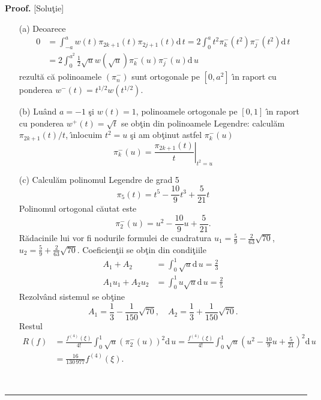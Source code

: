 \documentclass[a4paper]{article}%
\newenvironment{proof}[1][Proof]{\noindent\textbf{#1.} }{\ \rule{0.5em}{0.5em}}
\begin{document}
\begin{proof}
[Solu\c{t}ie]

\begin{enumerate}
\item[(a)] Deoarece%
\begin{align*}
0  & =\int_{-a}^{a}w(t)\pi_{2k+1}(t)\pi_{2j+1}(t)\mathrm{d}\,t=2\int_{0}%
^{a}t^{2}\pi_{k}^{-}(t^{2})\pi_{j}^{-}\left(  t^{2}\right)  \mathrm{d}\,t\\
& =2\int_{0}^{a^{2}}\frac{1}{2}\sqrt{u}w\left(  \sqrt{u}\right)  \pi_{k}%
^{-}(u)\pi_{j}^{-}\left(  u\right)  \mathrm{d}\,u
\end{align*}
rezult\u{a} c\u{a} polinoamele $\left(  \pi_{n}^{-}\right)  $ sunt ortogonale
pe $[0,a^{2}]$ \^{\i}n raport cu ponderea $w^{-}(t)=t^{1/2}w(t^{1/2})$.

\item[(b)] Lu\^{a}nd $a=-1$ \c{s}i $w(t)=1$, polinoamele ortogonale pe $[0,1]$
\^{\i}n raport cu ponderea $w^{+}(t)=\sqrt{t}$ se ob\c{t}in din polinoamele
Legendre: calcul\u{a}m $\pi_{2k+1}(t)/t$, \^{\i}nlocuim $t^{2}=u$ \c{s}i am
ob\c{t}inut astfel $\pi_{k}^{-}(u)$%
\[
\pi_{k}^{-}(u)=\left.  \frac{\pi_{2k+1}(t)}{t}\right\vert _{t^{2}=u}%
\]


\item[(c)] Calcul\u{a}m polinomul Legendre de grad 5
\[
\pi_{5}(t)=t^{5}-\frac{10}{9}t^{3}+\frac{5}{21}t
\]
Polinomul ortogonal c\u{a}utat este%
\[
\pi_{2}^{-}(u)=u^{2}-\frac{10}{9}u+\frac{5}{21}.
\]
R\u{a}dacinile lui vor fi nodurile formulei de cuadratura $u_{1}=\frac{5}%
{9}-\frac{2}{63}\sqrt{70}$, $u_{2}=\frac{5}{9}+\frac{2}{63}\sqrt{70}$.
Coeficien\c{t}ii se ob\c{t}in din condi\c{t}iile%
\begin{align*}
A_{1}+A_{2}  & =\int_{0}^{1}\sqrt{u}\mathrm{d}\,u=\frac{2}{3}\\
A_{1}u_{1}+A_{2}u_{2}  & =\int_{0}^{1}u\sqrt{u}\mathrm{d}\,u=\frac{2}{5}%
\end{align*}
Rezolv\^{a}nd sistemul se ob\c{t}ine%
\[
A_{1}=\frac{1}{3}-\frac{1}{150}\sqrt{70},\quad A_{2}=\frac{1}{3}+\frac{1}%
{150}\sqrt{70}.
\]
Restul%
\begin{align*}
R(f)  & =\frac{f^{(4)}(\xi)}{4!}\int_{0}^{1}\sqrt{u}\left(  \pi_{2}%
^{-}(u)\right)  ^{2}\mathrm{d}\,u=\frac{f^{(4)}(\xi)}{4!}\int_{0}^{1}\sqrt
{u}\left(  u^{2}-\frac{10}{9}u+\frac{5}{21}\right)  ^{2}\mathrm{d}\,u\\
& =\frac{16}{130\,977}f^{(4)}(\xi).
\end{align*}

\end{enumerate}


\end{proof}
\end{document}
